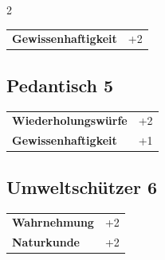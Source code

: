 \begin{multicols}{2}
\begin{tcolorbox}
\begin{tabular}{@{}ll@{}}
    \textbf{Gewissenhaftigkeit} & +2\\
\end{tabular}


\end{tcolorbox}

\begin{tcolorbox}
    \subsection*{Pedantisch \hfill \small{5 }}
    \tcblower




\begin{tabular}{@{}ll@{}}
    \textbf{Wiederholungswürfe} & +2\\
    \textbf{Gewissenhaftigkeit} & +1\\
\end{tabular}


\end{tcolorbox}

\begin{tcolorbox}
    \subsection*{Umweltschützer \hfill \small{6 }}
    \tcblower




\begin{tabular}{@{}ll@{}}
    \textbf{Wahrnehmung} & +2\\
    \textbf{Naturkunde} & +2\\
\end{tabular}


\end{tcolorbox}

\begin{tcolorbox}

\end{tcolorbox}
\end{multicols}
